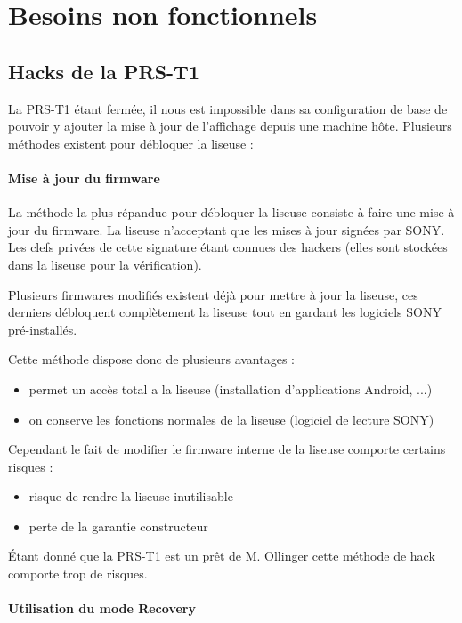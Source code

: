 \chapter{Besoins non fonctionnels}
\section{Hacks de la PRS-T1}

La PRS-T1 étant fermée, il nous est impossible dans sa configuration de base de pouvoir y ajouter la mise à jour 
de l'affichage depuis une machine hôte.
Plusieurs méthodes existent pour débloquer la liseuse : 

\subsubsection{Mise à jour du firmware}

La méthode la plus répandue pour débloquer la liseuse consiste à faire une mise à jour du firmware.
La liseuse n'acceptant que les mises à jour signées par SONY. Les clefs privées de cette signature étant connues des hackers (elles sont stockées dans la liseuse pour la vérification).

Plusieurs firmwares modifiés existent déjà pour mettre à jour la liseuse, ces derniers débloquent complètement la liseuse tout en gardant les logiciels SONY pré-installés.

Cette méthode dispose donc de plusieurs avantages : 
	\begin{itemize}
		\item permet un accès total a la liseuse (installation d'applications Android, ...)
		\item on conserve les fonctions normales de la liseuse (logiciel de lecture SONY)
	\end{itemize}
Cependant le fait de modifier le firmware interne de la liseuse comporte certains risques : 
	\begin{itemize}
		\item risque de rendre la liseuse inutilisable
		\item perte de la garantie constructeur
	\end{itemize}

Étant donné que la PRS-T1 est un prêt de M. Ollinger cette méthode de hack comporte trop de risques.

\subsubsection{Utilisation du mode Recovery}

